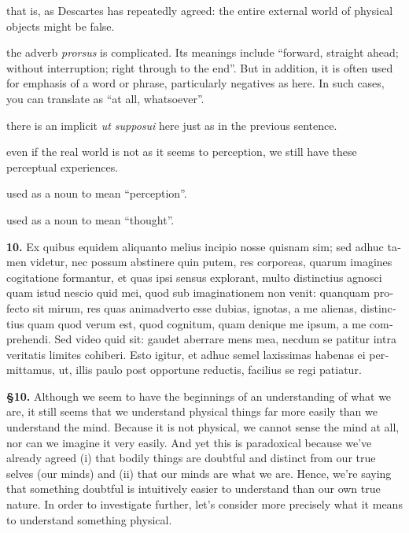  that is, as Descartes has repeatedly agreed: the entire external world of physical objects might be false.

 the adverb \textit{prorsus} is complicated. Its meanings include ``forward, straight ahead; without interruption; right through to the end''. But in addition, it is often used for emphasis of a word or phrase, particularly negatives as here. In such cases, you can translate as ``at all, whatsoever''.

 there is an implicit \textit{ut supposui} here just as in the previous sentence.

 even if the real world is not as it seems to perception, we still have these perceptual experiences.

 used as a noun to mean ``perception''.

 used as a noun to mean ``thought''.

\clearpage

\beginnumbering
\pstart
\begin{latin}
    \textenglish{\textbf{10.}} Ex quibus equidem aliquanto melius incipio nosse quisnam sim; sed adhuc tamen videtur, nec possum abstinere quin putem, res corporeas, quarum imagines cogitatione formantur, et quas ipsi sensus explorant, multo distinctius agnosci quam istud nescio quid mei, quod sub imaginationem non venit: quanquam profecto sit mirum, res quas animadverto esse dubias, ignotas, a me alienas, distinctius quam quod verum est, quod cognitum, quam denique me ipsum, a me comprehendi. Sed video quid sit: gaudet aberrare mens mea, necdum se patitur intra veritatis limites cohiberi. Esto igitur, et adhuc semel laxissimas habenas ei permittamus, ut, illis paulo post opportune reductis, facilius se regi patiatur.
\end{latin}
\pend
\endnumbering

\prenotes

\textbf{§10.} Although we seem to have the beginnings of an understanding of what we are, it still seems that we understand physical things far more easily than we understand the mind. Because it is not physical, we cannot sense the mind at all, nor can we imagine it very easily. And yet this is paradoxical because we've already agreed (i) that bodily things are doubtful and distinct from our true selves (our minds) and (ii) that our minds are what we are. Hence, we're saying that something doubtful is intuitively easier to understand than our own true nature. In order to investigate further, let's consider more precisely what it means to understand something physical.

